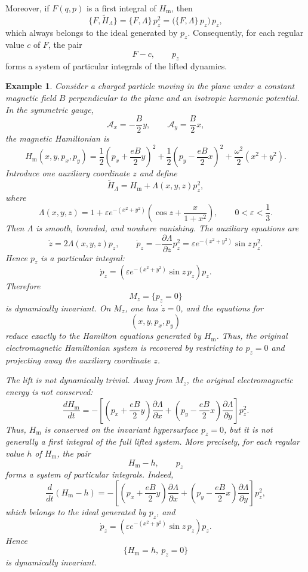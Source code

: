 \documentclass[10pt,a4paper]{article}
\newtheorem{example}{Example}
\begin{document}
Moreover, if $F(q,p)$ is a first integral of $H_{\mathrm{m}}$, then
\begin{equation*}
\{F, \widetilde{H}_\Lambda\} = \{F, \Lambda\}\, p_z^2
= \bigl(\{F, \Lambda\}\, p_z\bigr)\, p_z,
\end{equation*}
which always belongs to the ideal generated by $p_z$. Consequently, for each
regular value $c$ of $F$, the pair
\begin{equation*}
F - c, \qquad p_z
\end{equation*}
forms a system of particular integrals of the lifted dynamics.



\begin{example}
\label{ex:emauxiliarylift}
Consider a charged particle moving in the plane under a constant magnetic field \(B\) perpendicular to the plane and an isotropic harmonic potential. In the symmetric gauge,
\[
\mathcal A_x=-\frac{B}{2}y,
\qquad
\mathcal A_y=\frac{B}{2}x,
\]
the magnetic Hamiltonian is
\[
H_{\mathrm{m}}(x,y,p_x,p_y)
=
\frac{1}{2}
\left(p_x+\frac{eB}{2}y\right)^2
+
\frac{1}{2}
\left(p_y-\frac{eB}{2}x\right)^2
+
\frac{\omega^2}{2}(x^2+y^2).
\]
Introduce one auxiliary coordinate \(z\) and define
\[
\widetilde H_{\Lambda}
=
H_{\mathrm{m}}
+
\Lambda(x,y,z)p_z^2,
\]
where
\[
\Lambda(x,y,z)
=
1+\varepsilon e^{-(x^2+y^2)}
\left(
\cos z+\frac{x}{1+x^2}
\right),
\qquad
0<\varepsilon<\frac{1}{3}.
\]
Then \(\Lambda\) is smooth, bounded, and nowhere vanishing. The auxiliary equations are
\[
\dot z=2\Lambda(x,y,z)p_z,
\qquad
\dot p_z
=
-\frac{\partial \Lambda}{\partial z}p_z^2
=
\varepsilon e^{-(x^2+y^2)}\sin z\,p_z^2.
\]
Hence \(p_z\) is a particular integral:
\[
\dot p_z
=
\left(
\varepsilon e^{-(x^2+y^2)}\sin z\,p_z
\right)p_z.
\]
Therefore
\[
M_z=\{p_z=0\}
\]
is dynamically invariant. On \(M_z\), one has \(\dot z=0\), and the equations for
\[
(x,y,p_x,p_y)
\]
reduce exactly to the Hamilton equations generated by \(H_{\mathrm{m}}\). Thus, the original electromagnetic Hamiltonian system is recovered by restricting to \(p_z=0\) and projecting away the auxiliary coordinate \(z\).

The lift is not dynamically trivial. Away from \(M_z\), the original electromagnetic energy is not conserved:
\[
\frac{dH_{\mathrm{m}}}{dt}
=
-\left[
\left(p_x+\frac{eB}{2}y\right)\frac{\partial \Lambda}{\partial x}
+
\left(p_y-\frac{eB}{2}x\right)\frac{\partial \Lambda}{\partial y}
\right]p_z^2.
\]
Thus, \(H_{\mathrm{m}}\) is conserved on the invariant hypersurface \(p_z=0\), but it is not generally a first integral of the full lifted system. More precisely, for each regular value \(h\) of \(H_{\mathrm{m}}\), the pair
\[
H_{\mathrm{m}}-h,\qquad p_z
\]
forms a system of particular integrals. Indeed,
\[
\frac{d}{dt}(H_{\mathrm{m}}-h)
=
-\left[
\left(p_x+\frac{eB}{2}y\right)\frac{\partial \Lambda}{\partial x}
+
\left(p_y-\frac{eB}{2}x\right)\frac{\partial \Lambda}{\partial y}
\right]p_z^2,
\]
which belongs to the ideal generated by \(p_z\), and
\[
\dot p_z
=
\left(
\varepsilon e^{-(x^2+y^2)}\sin z\,p_z
\right)p_z.
\]
Hence
\[
\{H_{\mathrm{m}}=h,\ p_z=0\}
\]
is dynamically invariant.


\end{example}
\end{document}
